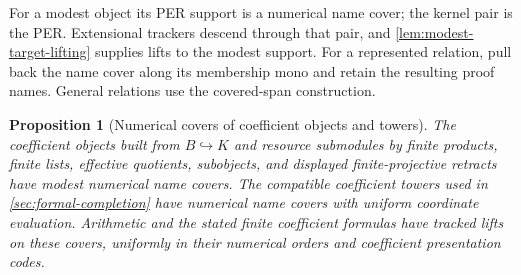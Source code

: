 \documentclass[11pt,a4paper]{article}
\numberwithin{algorithm}{section}
\numberwithin{equation}{section}
\newtheorem{proposition}[proposition]{Proposition}
\theoremstyle{definition}
\theoremstyle{remark}
\theoremstyle{plain}
\newcommand{\incl}{\hookrightarrow}
\theoremstyle{definition}
\theoremstyle{plain}
\begin{document}
For a modest object its PER support is a numerical name cover;
the kernel pair is the PER. Extensional trackers descend through
that pair, and \cref{lem:modest-target-lifting} supplies lifts to
the modest support. For a represented relation, pull back the
name cover along its membership mono and retain the resulting
proof names. General relations use the covered-span construction.

\begin{proposition}[Numerical covers of coefficient objects and towers]
\label{prop:coefficient-name-covers}
The coefficient objects built from $B\incl K$ and resource
submodules by finite products, finite lists, effective quotients,
subobjects, and displayed finite-projective retracts have modest
numerical name covers. The compatible coefficient towers used in
\cref{sec:formal-completion} have numerical name covers with uniform
coordinate evaluation. Arithmetic and the stated finite coefficient
formulas have tracked lifts on these covers, uniformly in their
numerical orders and coefficient presentation codes.
\end{proposition}
\end{document}

